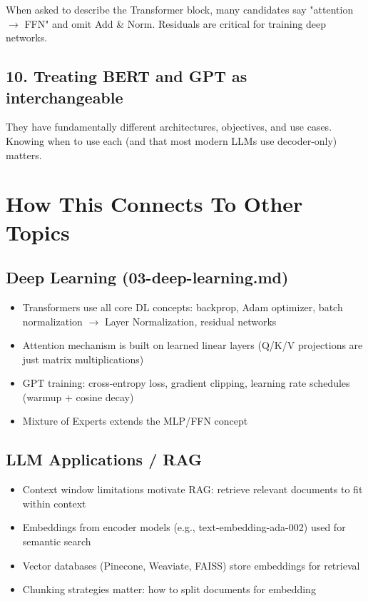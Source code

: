 \documentclass[11pt]{article}
\providecommand{\tightlist}{\setlength{\itemsep}{1pt}\setlength{\parskip}{0pt}}
\begin{document}
When asked to describe the Transformer block, many candidates say "attention \(\rightarrow\) FFN" and omit Add \& Norm. Residuals are critical for training deep networks.

\subsection{10. Treating BERT and GPT as interchangeable}\label{10-treating-bert-and-gpt-as-interchangeable}

They have fundamentally different architectures, objectives, and use cases. Knowing when to use each (and that most modern LLMs use decoder-only) matters.

\section{How This Connects To Other Topics}\label{how-this-connects-to-other-topics}

\subsection{Deep Learning (03-deep-learning.md)}\label{deep-learning-03-deep-learningmd}

\begin{itemize}
\tightlist
\item
  Transformers use all core DL concepts: backprop, Adam optimizer, batch normalization \(\rightarrow\) Layer Normalization, residual networks
\item
  Attention mechanism is built on learned linear layers (Q/K/V projections are just matrix multiplications)
\item
  GPT training: cross-entropy loss, gradient clipping, learning rate schedules (warmup + cosine decay)
\item
  Mixture of Experts extends the MLP/FFN concept
\end{itemize}

\subsection{LLM Applications / RAG}\label{llm-applications--rag}

\begin{itemize}
\tightlist
\item
  Context window limitations motivate RAG: retrieve relevant documents to fit within context
\item
  Embeddings from encoder models (e.g., text-embedding-ada-002) used for semantic search
\item
  Vector databases (Pinecone, Weaviate, FAISS) store embeddings for retrieval
\item
  Chunking strategies matter: how to split documents for embedding
\end{itemize}
\end{document}
